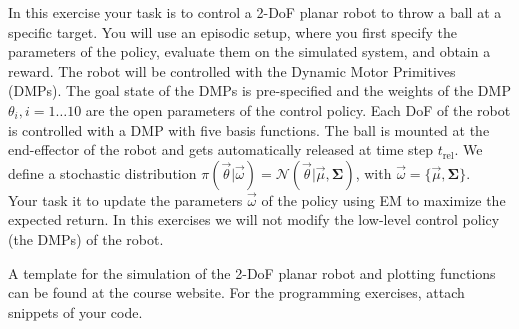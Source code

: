 \newif\ifvimbug
\vimbugfalse

\ifvimbug

\fi


In this exercise your task is to control a 2-DoF planar robot to throw a ball at a specific target. You will use an episodic setup, where you first specify the parameters of the policy, evaluate them on the simulated system, and obtain a reward. The robot will be controlled with the Dynamic Motor Primitives (DMPs).
The goal state of the DMPs is pre-specified and the weights of the DMP
$\theta_i, i = 1 \ldots 10$ are the open parameters of the control policy. Each DoF of the robot is controlled with a DMP with five basis functions. The ball is mounted at the end-effector of the robot and gets automatically released at time step $t_{\textrm{rel}}$.
We define a stochastic distribution $\pi(\vec{\theta}|\vec{\omega}) =
\mathcal{N}(\vec{\theta}|\vec{\mu},\boldsymbol{\Sigma})$, with $\vec{\omega} = \{\vec{\mu},\boldsymbol{\Sigma} \}$. \\
Your task it to update the parameters $\vec{\omega}$ of the policy using EM to maximize the expected return. In this exercises we will not
modify the low-level control policy (the DMPs) of the robot. 

A template for the simulation of the 2-DoF planar robot and plotting functions can be found at the course website. For the programming exercises, attach snippets of your code.

